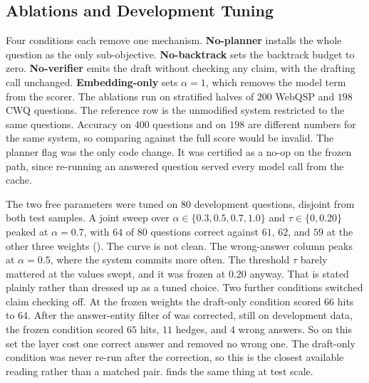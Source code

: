 \subsection{Ablations and Development Tuning}\label{sec:ablation-setup}

Four conditions each remove one mechanism. \textbf{No-planner} installs the
whole question as the only sub-objective. \textbf{No-backtrack} sets the
backtrack budget to zero. \textbf{No-verifier} emits the draft without checking
any claim, with the drafting call unchanged. \textbf{Embedding-only} sets
$\alpha = 1$, which removes the model term from the scorer. The ablations run on
stratified halves of $200$ WebQSP and $198$ CWQ questions. The reference row is
the unmodified system restricted to the same questions. Accuracy on $400$
questions and on $198$ are different numbers for the same system, so comparing
against the full score would be invalid. The planner flag was the only code
change. It was certified as a no-op on the frozen path, since re-running an
answered question served every model call from the cache.

The two free parameters were tuned on $80$ development questions, disjoint from
both test samples. A joint sweep over $\alpha \in \{0.3, 0.5, 0.7, 1.0\}$ and
$\tau \in \{0, 0.20\}$ peaked at $\alpha = 0.7$, with $64$ of $80$ questions
correct against $61$, $62$, and $59$ at the other three weights
(). The curve is not clean. The wrong-answer column peaks at
$\alpha = 0.5$, where the system commits more often. The threshold $\tau$ barely
mattered at the values swept, and it was frozen at $0.20$ anyway. That is stated
plainly rather than dressed up as a tuned choice. Two further conditions
switched claim checking off. At the frozen weights the draft-only condition
scored $66$ hits to $64$. After the answer-entity filter of
 was corrected, still on development data, the frozen
condition scored $65$ hits, $11$ hedges, and $4$ wrong answers. So on this set
the layer cost one correct answer and removed no wrong one. The draft-only
condition was never re-run after the correction, so this is the closest
available reading rather than a matched pair.  finds the
same thing at test scale.

